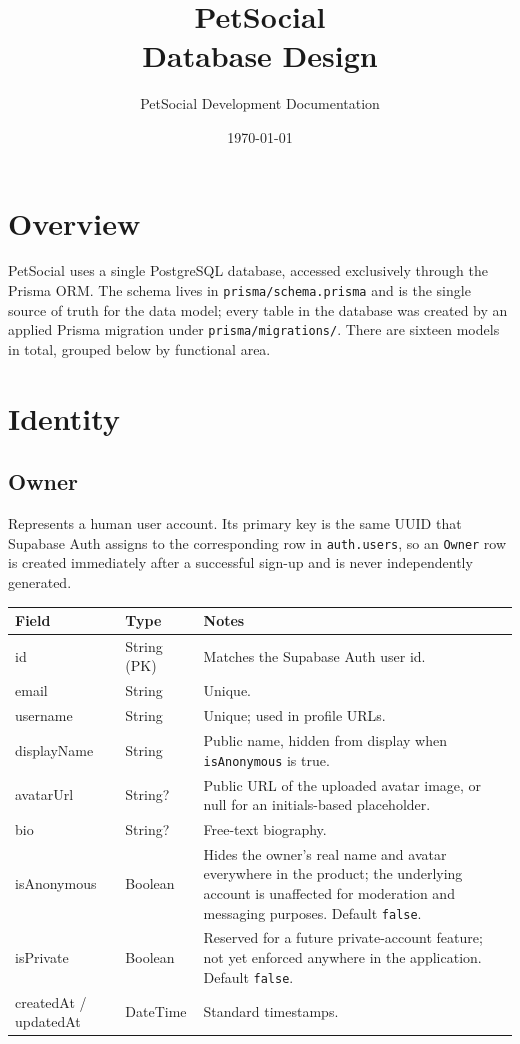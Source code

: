\documentclass[11pt,a4paper]{article}
\title{PetSocial\\\large Database Design}
\author{PetSocial Development Documentation}
\date{\today}
\makeatletter
\newcommand{\modeltable}[1]{%
  \begin{tabular}{@{}p{3.3cm}p{2.6cm}p{8.3cm}@{}}
  \toprule
  \textbf{Field} & \textbf{Type} & \textbf{Notes} \\
  \midrule
  #1
  \bottomrule
  \end{tabular}
}
\makeatother
\begin{document}
\maketitle
\thispagestyle{fancy}
\tableofcontents

\section{Overview}
PetSocial uses a single PostgreSQL database, accessed exclusively through the Prisma
ORM. The schema lives in \texttt{prisma/schema.prisma} and is the single source of
truth for the data model; every table in the database was created by an applied Prisma
migration under \texttt{prisma/migrations/}. There are sixteen models in total, grouped
below by functional area.

\section{Identity}

\subsection{Owner}
Represents a human user account. Its primary key is the same UUID that Supabase Auth
assigns to the corresponding row in \texttt{auth.users}, so an \texttt{Owner} row is
created immediately after a successful sign-up and is never independently generated.

\modeltable{
id & String (PK) & Matches the Supabase Auth user id. \\
email & String & Unique. \\
username & String & Unique; used in profile URLs. \\
displayName & String & Public name, hidden from display when \texttt{isAnonymous} is
  true. \\
avatarUrl & String? & Public URL of the uploaded avatar image, or null for an
  initials-based placeholder. \\
bio & String? & Free-text biography. \\
isAnonymous & Boolean & Hides the owner's real name and avatar everywhere in the
  product; the underlying account is unaffected for moderation and messaging purposes.
  Default \texttt{false}. \\
isPrivate & Boolean & Reserved for a future private-account feature; not yet enforced
  anywhere in the application. Default \texttt{false}. \\
createdAt / updatedAt & DateTime & Standard timestamps. \\
}
\end{document}
